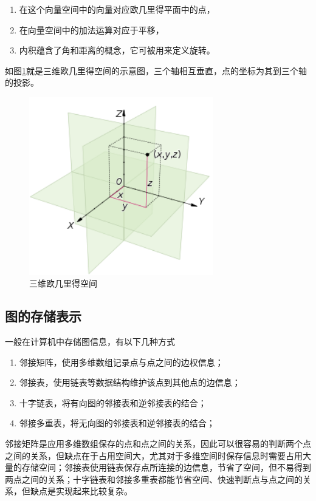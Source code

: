 \begin{enumerate}[.]
    \item 在这个向量空间中的向量对应欧几里得平面中的点，
    \item 在向量空间中的加法运算对应于平移，
    \item 内积蕴含了角和距离的概念，它可被用来定义旋转。
\end{enumerate}\par
如图\ref{fig:3axis}就是三维欧几里得空间的示意图，三个轴相互垂直，点的坐标为其到三个轴的投影。
\begin{figure}[h]
  \centering
  \includegraphics[width=8cm]{figures/3axis.png}
  \caption{三维欧几里得空间}  
  \label{fig:3axis}
\end{figure}
\subsection{图的存储表示}
一般在计算机中存储图信息，有以下几种方式
\begin{enumerate}
    \item 邻接矩阵，使用多维数组记录点与点之间的边权信息；
    \item 邻接表，使用链表等数据结构维护该点到其他点的边信息；
    \item 十字链表，将有向图的邻接表和逆邻接表的结合；
    \item 邻接多重表，将无向图的邻接表和逆邻接表的结合；
\end{enumerate}\par
邻接矩阵是应用多维数组保存的点和点之间的关系，因此可以很容易的判断两个点之间的关系，但缺点在于占用空间大，尤其对于多维空间时保存信息时需要占用大量的存储空间；邻接表使用链表保存点所连接的边信息，节省了空间，但不易得到两点之间的关系；十字链表和邻接多重表都能节省空间、快速判断点与点之间的关系，但缺点是实现起来比较复杂。

